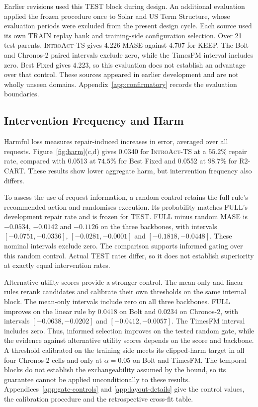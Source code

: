 \documentclass{article}
\newcommand{\introact}{\textsc{IntroAct-TS}}
\begin{document}
Earlier revisions used this TEST block during design. An additional evaluation applied
the frozen procedure once to Solar and US Term Structure, whose evaluation periods were
excluded from the present design cycle. Each source used its own TRAIN replay bank and
training-side configuration selection. Over 21 test parents, \introact{} gives 4.226 MASE
against 4.707 for KEEP. The Bolt and Chronos-2 paired intervals exclude zero, while the
TimesFM interval includes zero. Best Fixed gives 4.223, so this evaluation does not establish
an advantage over that control. These sources appeared in earlier development and are not
wholly unseen domains. Appendix~\ref{app:confirmatory} records the evaluation boundaries.

\subsection{Intervention Frequency and Harm}
\label{sec:exp-harm}
Harmful loss measures repair-induced increases in error, averaged over all requests.
Figure~\ref{fig:harm}(c,d) gives 0.0340 for \introact{} at a $55.2\%$ repair rate,
compared with 0.0513 at $74.5\%$ for Best Fixed and 0.0552 at $98.7\%$ for R2-CART.
These results show lower aggregate harm, but intervention frequency also differs.

To assess the use of request information, a random control retains the full rule's
recommended action and randomises execution. Its probability matches FULL's development
repair rate and is frozen for TEST. FULL minus random MASE is $-0.0534$, $-0.0142$ and
$-0.1126$ on the three backbones, with intervals $[-0.0751,-0.0336]$,
$[-0.0281,-0.0001]$ and $[-0.1818,-0.0448]$. These nominal intervals exclude zero.
The comparison supports informed gating over this random control. Actual TEST rates differ,
so it does not establish superiority at exactly equal intervention rates.

Alternative utility scores provide a stronger control. The mean-only and linear rules
rerank candidates and calibrate their own thresholds on the same internal block.
The mean-only intervals include zero on all three backbones. FULL improves on the linear
rule by 0.0418 on Bolt and 0.0234 on Chronos-2, with intervals
$[-0.0638,-0.0202]$ and $[-0.0412,-0.0057]$. The TimesFM interval includes zero.
Thus, informed selection improves on the tested random gate, while the evidence against
alternative utility scores depends on the score and backbone.
A threshold calibrated on the training side meets its clipped-harm target in all four
Chronos-2 cells and only at $\alpha=0.05$ on Bolt and TimesFM. The temporal blocks do
not establish the exchangeability assumed by the bound, so its guarantee cannot be applied
unconditionally to these results.
Appendices~\ref{app:gate-controls} and \ref{app:layout-details} give the control values, the
calibration procedure and the retrospective cross-fit table.
\end{document}
